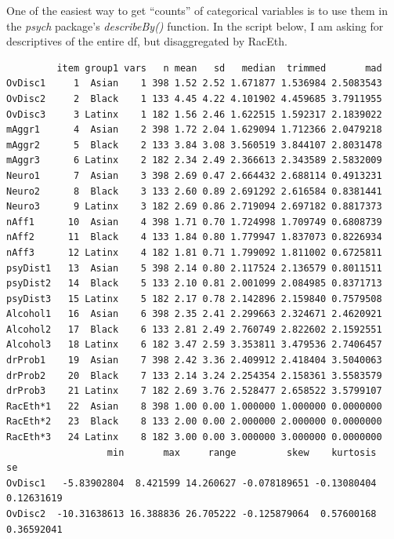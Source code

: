 \documentclass[
  english,
]{book}
\newenvironment{Shaded}{\begin{snugshade}}{\end{snugshade}}
\newcommand{\AttributeTok}[1]{\textcolor[rgb]{0.77,0.63,0.00}{#1}}
\newcommand{\ConstantTok}[1]{\textcolor[rgb]{0.00,0.00,0.00}{#1}}
\newcommand{\FunctionTok}[1]{\textcolor[rgb]{0.00,0.00,0.00}{#1}}
\newcommand{\NormalTok}[1]{#1}
\newcommand{\SpecialCharTok}[1]{\textcolor[rgb]{0.00,0.00,0.00}{#1}}
\begin{document}
One of the easiest way to get ``counts'' of categorical variables is to use them in the \emph{psych} package's \emph{describeBy()} function. In the script below, I am asking for descriptives of the entire df, but disaggregated by RacEth.

\begin{Shaded}
\end{Shaded}

\begin{verbatim}
         item group1 vars   n mean   sd   median  trimmed       mad
OvDisc1     1  Asian    1 398 1.52 2.52 1.671877 1.536984 2.5083543
OvDisc2     2  Black    1 133 4.45 4.22 4.101902 4.459685 3.7911955
OvDisc3     3 Latinx    1 182 1.56 2.46 1.622515 1.592317 2.1839022
mAggr1      4  Asian    2 398 1.72 2.04 1.629094 1.712366 2.0479218
mAggr2      5  Black    2 133 3.84 3.08 3.560519 3.844107 2.8031478
mAggr3      6 Latinx    2 182 2.34 2.49 2.366613 2.343589 2.5832009
Neuro1      7  Asian    3 398 2.69 0.47 2.664432 2.688114 0.4913231
Neuro2      8  Black    3 133 2.60 0.89 2.691292 2.616584 0.8381441
Neuro3      9 Latinx    3 182 2.69 0.86 2.719094 2.697182 0.8817373
nAff1      10  Asian    4 398 1.71 0.70 1.724998 1.709749 0.6808739
nAff2      11  Black    4 133 1.84 0.80 1.779947 1.837073 0.8226934
nAff3      12 Latinx    4 182 1.81 0.71 1.799092 1.811002 0.6725811
psyDist1   13  Asian    5 398 2.14 0.80 2.117524 2.136579 0.8011511
psyDist2   14  Black    5 133 2.10 0.81 2.001099 2.084985 0.8371713
psyDist3   15 Latinx    5 182 2.17 0.78 2.142896 2.159840 0.7579508
Alcohol1   16  Asian    6 398 2.35 2.41 2.299663 2.324671 2.4620921
Alcohol2   17  Black    6 133 2.81 2.49 2.760749 2.822602 2.1592551
Alcohol3   18 Latinx    6 182 3.47 2.59 3.353811 3.479536 2.7406457
drProb1    19  Asian    7 398 2.42 3.36 2.409912 2.418404 3.5040063
drProb2    20  Black    7 133 2.14 3.24 2.254354 2.158361 3.5583579
drProb3    21 Latinx    7 182 2.69 3.76 2.528477 2.658522 3.5799107
RacEth*1   22  Asian    8 398 1.00 0.00 1.000000 1.000000 0.0000000
RacEth*2   23  Black    8 133 2.00 0.00 2.000000 2.000000 0.0000000
RacEth*3   24 Latinx    8 182 3.00 0.00 3.000000 3.000000 0.0000000
                  min       max     range         skew    kurtosis         se
OvDisc1   -5.83902804  8.421599 14.260627 -0.078189651 -0.13080404 0.12631619
OvDisc2  -10.31638613 16.388836 26.705222 -0.125879064  0.57600168 0.36592041

\end{verbatim}
\end{document}
